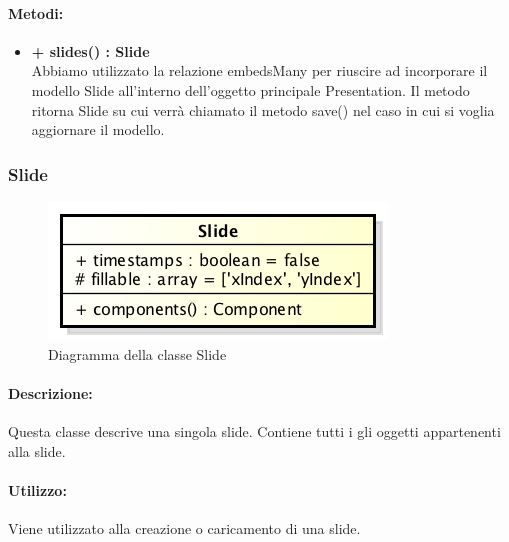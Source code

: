 	\paragraph{Metodi:}
	\begin{itemize}
		\item \textbf{+ slides() : Slide}\\
		Abbiamo utilizzato la relazione embedsMany per riuscire ad incorporare il modello Slide all’interno dell’oggetto principale Presentation. Il metodo ritorna Slide su cui verrà chiamato il metodo save() nel caso in cui si voglia aggiornare il modello.
	\end{itemize}
\newpage


\subsubsection{Slide}

	\begin{figure}[h]
		\centering
		\includegraphics[width=0.5\linewidth]{img/back_end_premi_model_slide}
		\caption[Diagramma della classe Slide]{Diagramma della classe Slide}
		\label{fig:back_end_premi_model_slide}
	\end{figure}


	\paragraph{Descrizione:}
	Questa classe descrive una singola slide. Contiene tutti i gli oggetti appartenenti alla slide.
	
	\paragraph{Utilizzo:}
	Viene utilizzato alla creazione o caricamento di una slide.

